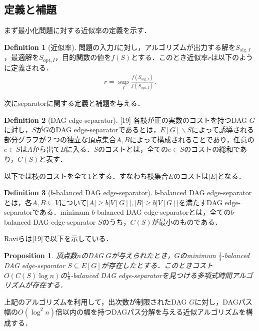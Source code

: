 \documentclass[master]{kuisthesis}		%
\theoremstyle{plain}
\newtheorem{proposition}{Proposition}
\theoremstyle{definition}
\newtheorem{definition*}{Definition}
\begin{document}
\subsection{定義と補題}
まず最小化問題に対する近似率の定義を示す．

\begin{definition*}[近似率]
    問題の入力$I$に対し，アルゴリズムが出力する解を$S_{\mathrm{alg}, I}$，最適解を$S_{\mathrm{opt}, I}$，目的関数の値を$f(S)$とする．このとき近似率$r$は以下のように定義される．
    \begin{align*}
        r = \sup_{I}\frac{f(S_{\mathrm{alg}, I})}{f(S_{\mathrm{opt}, I})}.
    \end{align*}
    
\end{definition*}


次にseparatorに関する定義と補題を与える．


\begin{definition*}[DAG edge-separator][19]
    各枝が正の実数のコストを持つDAG $G$に対し，$S$が$G$のDAG edge-separatorであるとは，$E[G]\backslash S$によって誘導される部分グラフが２つの独立な頂点集合$A, B$によって構成されることであり，任意の$e \in S$は$A$から出て$B$に入る．$S$のコストとは，全ての$e \in S$のコストの総和であり，$C(S)$と表す．
\end{definition*}

以下では枝のコストを全て1とする．すなわち枝集合$E$のコストは$|E|$となる．

\begin{definition*}[$b$-balanced DAG edge-separator]
    $b$-balanced DAG edge-separatorとは，各$A, B\subseteq V$について$|A| \geq b|V[G]|, |B| \geq b|V[G]|$を満たすDAG edge-separatorである．minimum $b$-balanced DAG edge-separatorとは，全ての$b$-balanced DAG edge-separator $S$のうち，$C(S)$が最小のものである．
\end{definition*}

Raviらは[19]で以下を示している．

\begin{proposition}\label{separator_algorithm}
    頂点数$n$のDAG $G$が与えられたとき，$G$のminimum $\frac{1}{3}$-balanced DAG edge-separator $S\subseteq E[G]$が存在したとする．このときコスト$O(C(S) \log n)$の$\frac{1}{8}$-balanced DAG edge-separatorを見つける多項式時間アルゴリズムが存在する．
\end{proposition}

上記のアルゴリズムを利用して，出次数が制限されたDAG $G$に対し，DAGパス幅の$O(\log ^2 n)$倍以内の幅を持つDAGパス分解を与える近似アルゴリズムを構成する．
\end{document}
